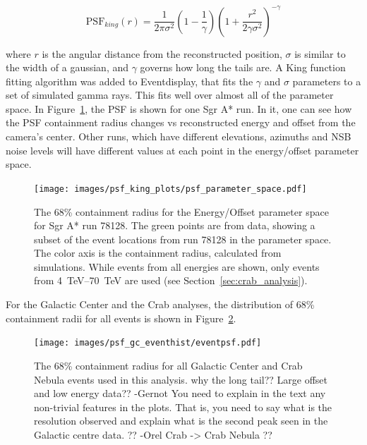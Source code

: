     \begin{equation} \label{eqn:king}
    \text{PSF}_{king}(r) = \frac{1}{2 \pi \sigma^{2} } \left( 1 - \frac{1}{\gamma} \right) \left( 1 + \frac{ r^{2} }{ 2 \gamma \sigma^{2} } \right)^{-\gamma}
    \end{equation}

    where $r$ is the angular distance from the reconstructed position, $\sigma$ is similar to the width of a gaussian, and $\gamma$ governs how long the tails are.
    A King function fitting algorithm was added to Eventdisplay, that fits the $\gamma$ and $\sigma$ parameters to a set of simulated gamma rays.
    This fits well over almost all of the parameter space.
    In Figure~\ref{fig:psf_paramspace}, the PSF is shown for one Sgr A* run.
    In it, one can see how the PSF containment radius changes vs reconstructed energy and offset from the camera's center.
    Other runs, which have different elevations, azimuths and NSB noise levels will have different values at each point in the energy/offset parameter space.

    \begin{figure}[ht]
      \centering
      \texttt{[image: images/psf\_king\_plots/psf\_parameter\_space.pdf]}
      \caption[PSF Parameter Space]{
        The 68\% containment radius for the Energy/Offset parameter space for Sgr A* run 78128. 
        The green points are from data, showing a subset of the event locations from run 78128 in the parameter space.
        The color axis is the containment radius, calculated from simulations.
        While events from all energies are shown, only events from \SIrange{4}{70}{\TeV} are used (see Section~\ref{sec:crab_analysis}).
      }
      \label{fig:psf_paramspace}
    \end{figure}

    For the Galactic Center and the Crab analyses, the distribution of 68\% containment radii for all events is shown in Figure~\ref{fig:gc_psf_hist}.

    \begin{figure}[ht]
      \centering
      \texttt{[image: images/psf\_gc\_eventhist/eventpsf.pdf]}
      \caption[Crab and Galactic Center Event PSFs]{
        The 68\% containment radius for all Galactic Center and Crab Nebula events used in this analysis.
        {\color{red}why the long tail?? Large offset and low energy data?? -Gernot}
        {\color{red}You need to explain in the text any non-trivial features in the plots. That is, you need to say what is the resolution observed and explain what is the second peak seen in the Galactic centre data. ?? -Orel}
        {\color{red}Crab -> Crab Nebula ??}
      }
      \label{fig:gc_psf_hist}
    \end{figure}
  
